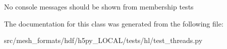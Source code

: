 \begin{DoxyVerb}No console messages should be shown from membership tests \end{DoxyVerb}
 

The documentation for this class was generated from the following file\+:\begin{DoxyCompactItemize}
\item 
src/mesh\+\_\+formats/hdf/h5py\+\_\+\+L\+O\+C\+A\+L/tests/hl/test\+\_\+threads.\+py\end{DoxyCompactItemize}
